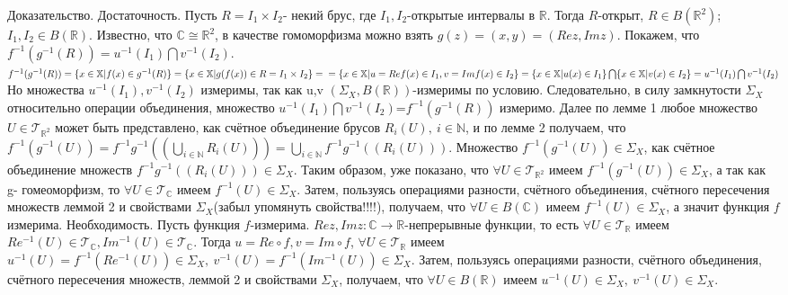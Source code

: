 \documentclass[a4paper,14pt]{article}
\begin{document}
$\textbf{Доказательство. Достаточность.}$ Пусть $R=I_1\times I_2$- некий брус, где $I_1,I_2$-открытые интервалы в $\mathbb{R}$.
Тогда $R$-открыт, $R\in B(\mathbb{R}^2)$; $I_1,I_2\in B(\mathbb{R})$. Известно, что $\mathbb{C}\cong \mathbb{R}^2$, в качестве гомоморфизма можно взять $g(z)=(x,y)=(Rez,Imz)$. Покажем, что $f^{-1}(g^{-1}(R))=u^{-1}(I_1)\bigcap v^{-1}(I_2)$.\newline
$f^{-1}(g^{-1}(R))=\{x\in\mathbb{X}|f(x)\in g^{-1}(R)\}=\{x\in\mathbb{X}|g(f(x))\in R=I_1\times I_2\}=\newline
=\{x\in\mathbb{X}|u=Ref(x)\in I_1, v=Imf(x)\in I_2\}=\{x\in\mathbb{X}|u(x)\in I_1\}\bigcap\{x\in\mathbb{X}|v(x)\in I_2\}=u^{-1}(I_1)\bigcap v^{-1}(I_2)$\newline
Но множества $u^{-1}(I_1),v^{-1}(I_2)$ измеримы, так как u,v $(\Sigma_X,B(\mathbb{R}))$-измеримы по условию. Следовательно, в силу замкнутости $\Sigma_X$ относительно операции объединения, множество $u^{-1}(I_1)\bigcap v^{-1}(I_2)$=$f^{-1}(g^{-1}(R))$ измеримо. Далее по лемме 1 любое множество $U\in\mathcal{T}_{\mathbb{R}^2}$ может быть представлено, как счётное объединение брусов $R_i(U),\ i\in\mathbb{N}$, и по лемме 2 получаем, что $f^{-1}(g^{-1}(U))=f^{-1}g^{-1}((\bigcup\limits_{i\in\mathbb{N}} R_i(U)))=\bigcup\limits_{i\in\mathbb{N}} f^{-1}g^{-1}((R_i(U)))$. Множество $f^{-1}(g^{-1}(U))\in\Sigma_X$, как счётное объединение множеств $f^{-1}g^{-1}((R_i(U)))\in\Sigma_X$. Таким образом, уже показано, что $\forall U\in\mathcal{T}_{\mathbb{R}^2}$ имеем $f^{-1}(g^{-1}(U))\in\Sigma_X$, а так как g- гомеоморфизм, то $\forall U\in\mathcal{T}_{\mathbb{C}}$ имеем $f^{-1}(U)\in\Sigma_X$. Затем, пользуясь операциями разности, счётного объединения, счётного пересечения множеств леммой 2 и свойствами $\Sigma_X$(забыл упомянуть свойства!!!!), получаем, что $\forall U\in B(\mathbb{C})$ имеем $f^{-1}(U)\in\Sigma_X$, а значит функция $f$ измерима.\newline
$\textbf{Необходимость.}$ Пусть функция $f$-измерима. $Rez,Imz:\mathbb{C}\rightarrow\mathbb{R}$-непрерывные функции, то есть $\forall U\in\mathcal{T}_{\mathbb{R}}$ имеем $Re^{-1}(U)\in\mathcal{T}_{\mathbb{C}},Im^{-1}(U)\in\mathcal{T}_{\mathbb{C}}$. Тогда $u=Re\circ f, v=Im\circ f$, $\forall U\in\mathcal{T}_{\mathbb{R}}$ имеем $u^{-1}(U)=f^{-1}(Re^{-1}(U))\in \Sigma_X,\ v^{-1}(U)=f^{-1}(Im^{-1}(U))\in \Sigma_X$. Затем, пользуясь операциями разности, счётного объединения, счётного пересечения множеств, леммой 2 и свойствами $\Sigma_X$, получаем, что $\forall U\in B(\mathbb{R})$ имеем $u^{-1}(U)\in\Sigma_X,\ v^{-1}(U)\in\Sigma_X$.\newline
\end{document}
